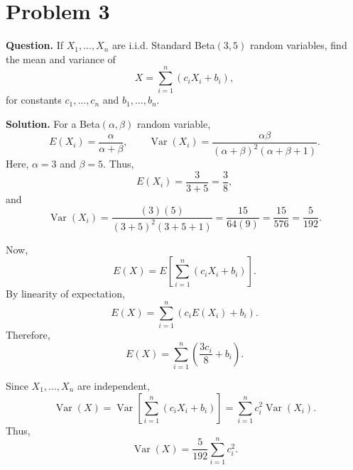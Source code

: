 \documentclass[11pt]{article}
\begin{document}
\section*{Problem 3}

\textbf{Question.} If $X_1,\ldots,X_n$ are i.i.d. Standard Beta$(3,5)$ random variables, find the mean and variance of
\[
X=\sum_{i=1}^n(c_iX_i+b_i),
\]
for constants $c_1,\ldots,c_n$ and $b_1,\ldots,b_n$.

\textbf{Solution.} For a Beta$(\alpha,\beta)$ random variable,
\[
E(X_i)=\frac{\alpha}{\alpha+\beta},
\qquad
\operatorname{Var}(X_i)=\frac{\alpha\beta}{(\alpha+\beta)^2(\alpha+\beta+1)}.
\]
Here, $\alpha=3$ and $\beta=5$. Thus,
\[
E(X_i)=\frac{3}{3+5}=\frac{3}{8},
\]
and
\[
\operatorname{Var}(X_i)=\frac{(3)(5)}{(3+5)^2(3+5+1)}=\frac{15}{64(9)}=\frac{15}{576}=\frac{5}{192}.
\]

Now,
\[
E(X)=E\left[\sum_{i=1}^{n}(c_iX_i+b_i)\right].
\]
By linearity of expectation,
\[
E(X)=\sum_{i=1}^{n}\left(c_iE(X_i)+b_i\right).
\]
Therefore,
\[
\boxed{E(X)=\sum_{i=1}^{n}\left(\frac{3c_i}{8}+b_i\right)}.
\]

Since $X_1,\ldots,X_n$ are independent,
\[
\operatorname{Var}(X)=\operatorname{Var}\left[\sum_{i=1}^{n}(c_iX_i+b_i)\right]=\sum_{i=1}^{n}c_i^2\operatorname{Var}(X_i).
\]
Thus,
\[
\boxed{\operatorname{Var}(X)=\frac{5}{192}\sum_{i=1}^{n}c_i^2}.
\]

\newpage
\end{document}
